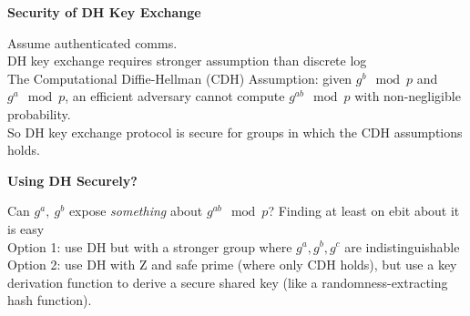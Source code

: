 \documentclass{article}
\begin{document}
\textbf{Security of DH Key Exchange}

Assume authenticated comms.\\
DH key exchange requires stronger assumption than discrete log\\
The Computational Diffie-Hellman (CDH) Assumption: given $g^b\mod p$ and $g^a\mod p$, an efficient adversary cannot compute $g^{ab}\mod p$ with non-negligible probability.\\
So DH key exchange protocol is secure for groups in which the CDH assumptions holds.

\textbf{Using DH Securely?}

Can $g^a,\ g^b$ expose \textit{something} about $g^{ab}\mod p$? Finding at least on ebit about it is easy\\
Option 1: use DH but with a stronger group where $g^a,g^b,g^c$ are indistinguishable\\
Option 2: use DH with Z and safe prime (where only CDH holds), but use a key derivation function to derive a secure shared key (like a randomness-extracting hash function).
\end{document}
